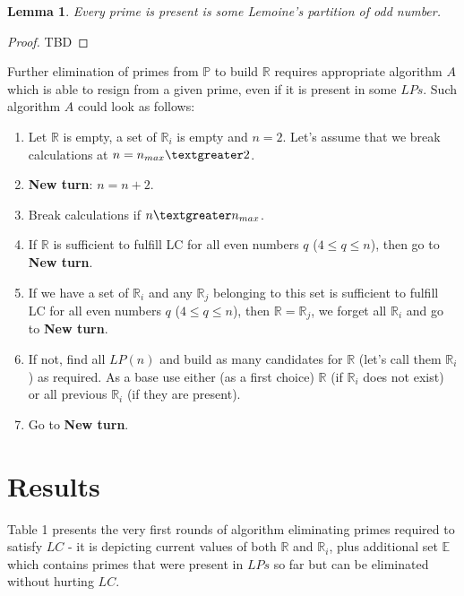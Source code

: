 \documentclass[10pt,twocolumn]{article}
\newtheorem{lemma}[theorem]{Lemma}
\begin{document}
\begin{lemma}
Every prime is present is some Lemoine's  partition of odd number.
\end{lemma}
\begin{proof}
TBD
\end{proof}

Further elimination of primes from $\mathbb{P}$ to build $\mathbb{R}$ requires appropriate algorithm $A$ which is able to resign from a given prime, even if it is present in some $LPs$. Such algorithm $A$ could look as follows:

\begin{enumerate}
\item  Let $\mathbb{R}$ is empty, a set of $\mathbb{R}_i$ is empty and $n = 2$. Let's assume that we break calculations at $n = n_{max} \textgreater 2$.
\item  \textbf{New turn}: $n = n + 2$.
\item Break calculations if $n \textgreater n_{max}$.
\item  If  $\mathbb{R}$ is sufficient to fulfill LC for all even numbers $q$ ($ 4 \leq q \leq n$), then go to \textbf{New turn}.
\item  If  we have a set of  $\mathbb{R}_i$ and any $\mathbb{R}_j$ belonging to this set is sufficient to fulfill LC for all even numbers $q$ ($ 4 \leq q \leq n$), then $\mathbb{R} = \mathbb{R}_j$, we forget all $\mathbb{R}_i$ and go to \textbf{New turn}.
\item  If  not, find all $LP(n)$ and build as many candidates for $\mathbb{R}$ (let's call them $\mathbb{R}_i$) as required. As a base use either (as  a first choice) $\mathbb{R}$ (if $\mathbb{R}_i$ does not exist) or all previous $\mathbb{R}_i$ (if they are present).
\item Go to \textbf{New turn}.
\end{enumerate}

\section{Results}

Table 1 presents the very first rounds of algorithm eliminating primes required to satisfy $LC$ - it is depicting current values of both $\mathbb{R}$ and $\mathbb{R}_i$, plus additional set $\mathbb{E}$ which contains primes that were present in $LPs$ so far but can be eliminated without hurting $LC$. 
\end{document}
